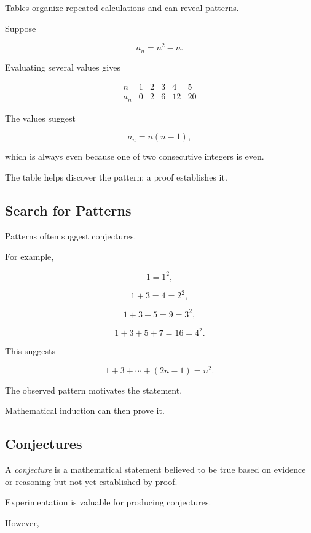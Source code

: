 Tables organize repeated calculations and can reveal patterns.

Suppose

\[ a_n=n^2-n. \]

Evaluating several values gives

\[
\begin{array}{c|ccccc}
n&1&2&3&4&5\\ \hline
a_n&0&2&6&12&20
\end{array}
\]

The values suggest

\[ a_n=n(n-1), \]

which is always even because one of two consecutive integers is even.

The table helps discover the pattern; a proof establishes it.

\subsection{Search for Patterns}
\label{subsec:search-patterns}

Patterns often suggest conjectures.

For example,

\[ 1=1^2, \]

\[ 1+3=4=2^2, \]

\[ 1+3+5=9=3^2, \]

\[ 1+3+5+7=16=4^2. \]

This suggests

\[ 1+3+\cdots+(2n-1)=n^2. \]

The observed pattern motivates the statement.

Mathematical induction can then prove it.

\subsection{Conjectures}
\label{subsec:problem-solving-conjectures}

A \emph{conjecture} is a mathematical statement believed to be true based on
evidence or reasoning but not yet established by proof.

Experimentation is valuable for producing conjectures.

However,

